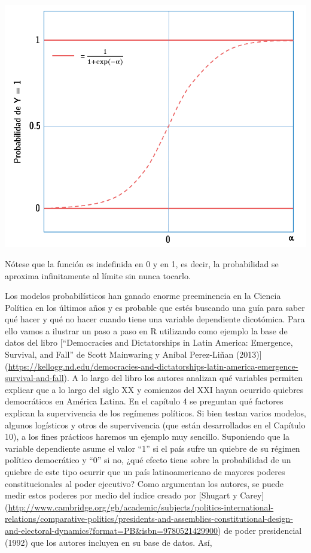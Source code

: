 \documentclass[]{book}
\begin{document}
\includegraphics[width=1.2\linewidth]{00-images/fig_7_3}

Nótese que la función es indefinida en 0 y en 1, es decir, la
probabilidad se aproxima infinitamente al límite sin nunca tocarlo.

Los modelos probabilísticos han ganado enorme preeminencia en la Ciencia
Política en los últimos años y es probable que estés buscando una guía
para saber qué hacer y qué no hacer cuando tiene una variable
dependiente dicotómica. Para ello vamos a ilustrar un paso a paso en R
utilizando como ejemplo la base de datos del libro {[}``Democracies and
Dictatorships in Latin America: Emergence, Survival, and Fall'' de Scott
Mainwaring y Aníbal Perez-Liñan (2013){]}
(\url{https://kellogg.nd.edu/democracies-and-dictatorships-latin-america-emergence-survival-and-fall}).
A lo largo del libro los autores analizan qué variables permiten
explicar que a lo largo del siglo XX y comienzos del XXI hayan ocurrido
quiebres democráticos en América Latina. En el capítulo 4 se preguntan
qué factores explican la supervivencia de los regímenes políticos. Si
bien testan varios modelos, algunos logísticos y otros de supervivencia
(que están desarrollados en el Capítulo 10), a los fines prácticos
haremos un ejemplo muy sencillo. Suponiendo que la variable dependiente
asume el valor ``1'' si el país sufre un quiebre de su régimen político
democrático y ``0'' si no, ¿qué efecto tiene sobre la probabilidad de un
quiebre de este tipo ocurrir que un país latinoamericano de mayores
poderes constitucionales al poder ejecutivo? Como argumentan los
autores, se puede medir estos poderes por medio del índice creado por
{[}Shugart y Carey{]}
(\url{http://www.cambridge.org/gb/academic/subjects/politics-international-relations/comparative-politics/presidents-and-assemblies-constitutional-design-and-electoral-dynamics?format=PB\&isbn=9780521429900})
de poder presidencial (1992) que los autores incluyen en su base de
datos. Así,
\end{document}
